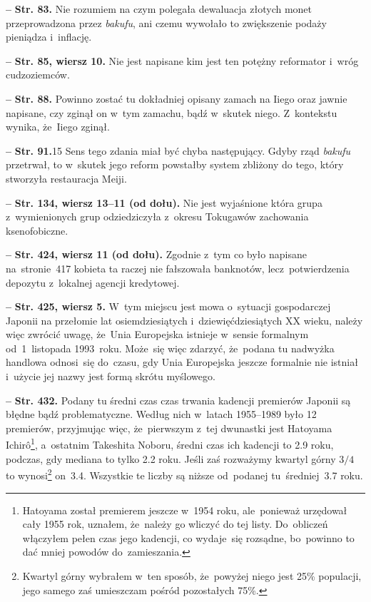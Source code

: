 \documentclass[a4paper,11pt]{article}
\newcommand{\spaceFour}{0.5em}
\newcommand{\tb}{\textbf}
\newcommand{\noi}{\noindent}
\newcommand{\start}{\noi \tb{--} {}}
\newcommand{\Str}[1]{\tb{Str. #1.}}
\newcommand{\StrWg}[2]{\tb{Str. #1, wiersz #2.}}
\newcommand{\StrWd}[2]{\tb{Str. #1, wiersz #2 (od dołu).}}
\begin{document}
\start \Str{83} Nie rozumiem na czym polegała dewaluacja złotych monet
przeprowadzona przez \emph{bakufu}, ani czemu wywołało to zwiększenie
podaży pieniądza i~inflację.

\vspace{\spaceFour}


\start \StrWg{85}{10} Nie jest napisane kim jest ten potężny
reformator i~wróg cudzoziemców.

\vspace{\spaceFour}


\start \Str{88} Powinno zostać tu dokładniej opisany zamach na Iiego
oraz jawnie napisane, czy zginął on w~tym zamachu, bądź w~skutek
niego. Z~kontekstu wynika, że~Iiego zginął.

\vspace{\spaceFour}


\start \Str{91}{15} Sens tego zdania miał być chyba następujący. Gdyby
rząd \emph{bakufu} przetrwał, to w~skutek jego reform powstałby system
zbliżony do tego, który stworzyła restauracja Meiji.

\vspace{\spaceFour}


\start \StrWd{134}{13--11} Nie jest wyjaśnione która grupa
z~wymienionych grup odziedziczyła z~okresu Tokugawów zachowania
ksenofobiczne.

\vspace{\spaceFour}


\start \StrWd{424}{11} Zgodnie z~tym co było napisane na~stronie~417
kobieta ta raczej nie fałszowała banknotów, lecz~potwierdzenia
depozytu z~lokalnej agencji kredytowej.

\vspace{\spaceFour}


\start \StrWg{425}{5} W~tym miejscu jest mowa o~sytuacji gospodarczej
Japonii na przełomie lat osiemdziesiątych i~dziewięćdziesiątych XX
wieku, należy więc zwrócić uwagę, że~Unia Europejska istnieje w~sensie
formalnym od~1~listopada 1993~roku. Może~się więc zdarzyć, że~podana
tu nadwyżka handlowa odnosi~się do~czasu, gdy Unia Europejska jeszcze
formalnie nie istniał i~użycie jej nazwy jest formą skrótu myślowego.

\vspace{\spaceFour}


\start \Str{432} Podany tu średni czas czas trwania kadencji premierów
Japonii są błędne bądź problematyczne. Według nich w~latach 1955--1989
było 12 premierów, przyjmując więc, że~pierwszym z~tej dwunastki jest
Hatoyama Ichir\^{o}\footnote{Hatoyama został premierem jeszcze w~1954
  roku, ale~ponieważ urzędował cały 1955 rok, uznałem, że~należy go
  wliczyć do tej listy. Do~obliczeń włączyłem pełen czas jego
  kadencji, co wydaje~się rozsądne, bo~powinno to dać mniej powodów
  do~zamieszania.}, a~ostatnim Takeshita Noboru, średni czas ich
kadencji to 2.9 roku, podczas, gdy mediana to tylko 2.2 roku. Jeśli
zaś rozważymy kwartyl górny $3/4$ to wynosi\footnote{Kwartyl górny
  wybrałem w~ten sposób, że~powyżej niego jest 25\% populacji, jego
  samego zaś umieszczam pośród pozostałych 75\%.} on~3.4. Wszystkie te
liczby są niższe od~podanej tu~średniej~3.7 roku.
\end{document}
